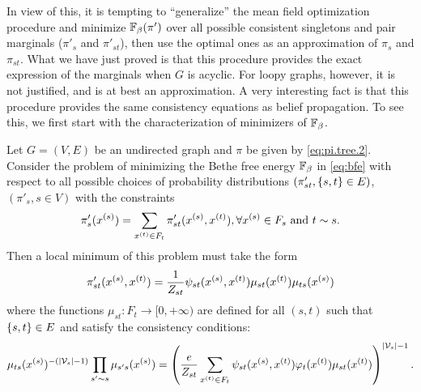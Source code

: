 In view of this, it is tempting to ``generalize'' the mean field
optimization procedure and minimize $\mathbb F_\beta(\pi')$ over all possible consistent
singletons and pair marginals ($\pi'_s$ and $\pi'_{st}$), then use the
optimal ones as an approximation of $\pi_s$ and $\pi_{st}$. What we
have just proved is that this procedure 
provides the exact expression of the marginals when $G$ is acyclic. For loopy graphs,
however, it is not justified, and is at best an approximation. A very
interesting fact is that this procedure provides the same consistency
equations as belief propagation. To see this, we first start with the
characterization of minimizers of $\mathbb F_\beta$.
\begin{proposition}
\label{prop:bethe.loopy}
Let $G=(V,E)$ be an undirected graph and $\pi$ be given by \cref{eq:pi.tree.2}. Consider the problem of minimizing the
Bethe free energy $\mathbb F_\beta$ in \cref{eq:bfe} with respect to all
possible choices of probability distributions $(\pi'_{st},
\left\{ s,t \right\}\in E)$, $(\pi'_s, s\in V)$ with the
constraints
$$
\pi'_{s}(x^{(s)}) = \sum_{x^{(t)}\in F_t} \pi'_{st}(x^{(s)},x^{(t)}), \forall x^{(s)}\in
F_s \text{ and } t\sim s.
$$
Then a local minimum of this problem must take the form
\begin{equation}
\label{eq:bethe.loopy.1}
\pi'_{st}(x^{(s)}, x^{(t)}) = \frac{1}{Z_{st}}\psi_{st}(x^{(s)}, x^{(t)}) \mu_{st}(x^{(t)}) 
\mu_{ts}(x^{(s)})
\end{equation}
where the functions $\mu_{st}: F_t\to [0, +\infty)$ are defined for all $ (s,t)$
such that $\left\{ s,t \right\}\in E$ and satisfy the consistency conditions:
\begin{equation}
\label{eq:bethe.loopy.2}
\mu_{ts}(x^{(s)})^{-(|{\mathcal V}_s|-1)} \prod_{s'\sim
s}\mu_{s's}(x^{(s)}) 
= \left(\frac{e}{Z_{st}}
\sum_{x^{(t)}\in F_t} \psi_{st}(x^{(s)},x^{(t)}) \varphi_t(x^{(t)}) \mu_{st}(x^{(t)})\right)^{|{\mathcal V}_s|-1}.
\end{equation}
\end{proposition}
